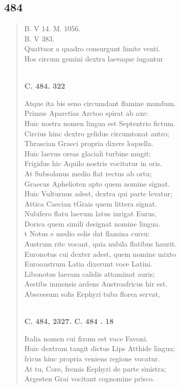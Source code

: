 \documentclass[11pt, a4paper]{report}
\begin{document}
            \subsection*{484}
      \begin{verse}
      B. V 14. M. 1056. \\ B. V 383. \\ Quattuor a quadro consurgunt limite venti. \\ Hos circum gemini dextra laevaque iugantur \\ 
        ﻿\pagebreak 
    \begin{center} \textbf{C. 484. 322} \end{center}Atque ita bis seno circumdant flamine mundum. \\ Primus Aparctias Arctoo spirat ab axe: \\ Huic nostra nomen lingua est Septentrio fictum. \\ Circius hinc dextro gelidus circumtonat antro; \\ Thrascian Graeci propria dixere loquella. \\ Huic laevus oreas glaciali turbine mugit; \\ Frigidus hic Aquilo nostris vocitatur in oris. \\ At Subsolanus medio flat rectus ab ortu; \\ Graecus Aphelioten apto quem nomine signat. \\ Huic Vulturnus adest, dextra qui parte levatur; \\ Attica Caecian tGrais quem littera signat. \\ Nubifero flatu laevum latus inrigat Eurus, \\ Dorica quem simili designat nomine lingua. \\ t Notus e medio solis dat flamina cursu: \\ Austrum rite vocant, quia nubila flatibus haurit. \\ Euronotus cui dexter adest, quem nomine mixto \\ Euroaustrum Latia dixerunt voce Latini. \\ Libonotus laevam calidis attaminat auris; \\ Aestibs inmensis ardens Austroafricus hir est. \\ Abscessum solis Eephyri tuba florea servat, \\ 
        ﻿\pagebreak 
    \begin{center} \textbf{C. 484, 2327. C. 484 . 18} \end{center}Italia nomen cui fixum est voce Favoni. \\ Huic dextram tangit dictus Lips Atthide lingua; \\ fricus hinc propria veniens regione vocatur. \\ At tu, Core, fremis Eephyri de parte sinistra; \\ Argesten Grai vocitant cognomine prisco. \\ 
      \end{verse}
  
\end{document}
